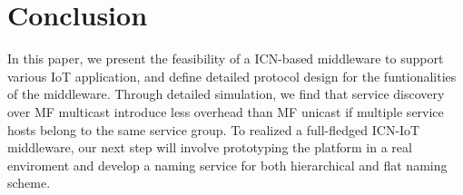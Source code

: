 \section{Conclusion}
In this paper, we present the feasibility of a ICN-based middleware to support various IoT application, and define detailed protocol design for the funtionalities of the middleware. Through detailed simulation, we find that service discovery over MF multicast introduce less overhead than MF unicast if multiple service hosts belong to the same service group. To realized a full-fledged ICN-IoT middleware, our next step will involve prototyping the platform in a real enviroment and develop a naming service for both hierarchical and flat naming scheme.    